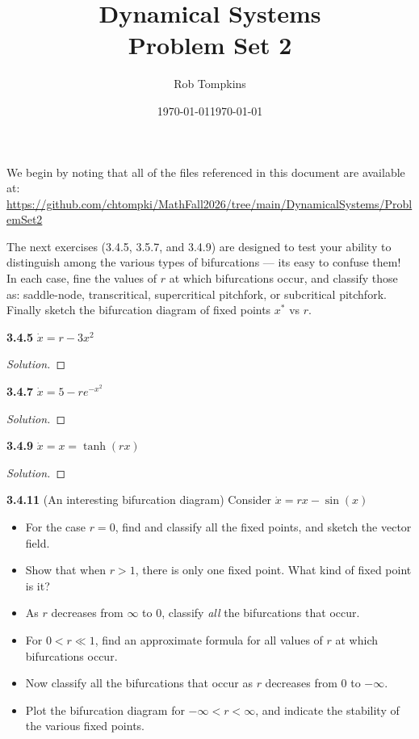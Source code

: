 \documentclass[10pt]{amsart}
\title{Dynamical Systems\\Problem Set 2}
\author{Rob Tompkins}
\date{\today}
\newenvironment{solution}
{\begin{proof}[Solution]}
{\end{proof}}
\begin{document}
    \maketitle
    \date{\today}
    \begin{onehalfspace}
        We begin by noting that all of the files referenced in this document are available at: \\
        \underline{https://github.com/chtompki/MathFall2026/tree/main/DynamicalSystems/ProblemSet2}

        The next exercises (3.4.5, 3.5.7, and 3.4.9) are designed to test your ability to distinguish among the various
        types of bifurcations --- its easy to confuse them!
        In each case, fine the values of $r$ at which bifurcations occur, and classify those as: saddle-node,
        transcritical, supercritical pitchfork, or subcritical pitchfork.
        Finally sketch the bifurcation diagram of fixed points $x^*$ vs $r$.

        \noindent\textbf{3.4.5} $\dot{x} = r - 3x^2$

        \begin{solution}
        \end{solution}

        \noindent\textbf{3.4.7} $\dot{x} = 5 - re^{-x^2}$

        \begin{solution}
        \end{solution}

        \noindent\textbf{3.4.9} $\dot{x} = x = \tanh{(rx)}$

        \begin{solution}
        \end{solution}

        \noindent\textbf{3.4.11} (An interesting bifurcation diagram) Consider $\dot{x} = rx - \sin{(x)}$
        \begin{itemize}
            \item[a)] For the case $r = 0$, find and classify all the fixed points, and sketch the vector field.
            \item[b)] Show that when $r > 1$, there is only one fixed point.
            What kind of fixed point is it?
            \item[c)] As $r$ decreases from $\infty$ to $0$, classify \emph{all} the bifurcations that occur.
            \item[d)] For $0 < r \ll 1$, find an approximate formula for all values of $r$ at which bifurcations occur.
            \item[e)] Now classify all the bifurcations that occur as $r$ decreases from $0$ to $-\infty$.
            \item[f)] Plot the bifurcation diagram for $-\infty < r < \infty$, and indicate the stability of the various
            fixed points.
        \end{itemize}


\end{onehalfspace}
\end{document}
